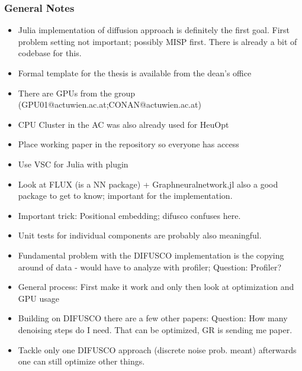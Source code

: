 \subsubsection{General Notes}
\begin{itemize}
    \item Julia implementation of diffusion approach is definitely the first goal. First problem setting not important; possibly MISP first. There is already a bit of codebase for this.
    \item Formal template for the thesis is available from the dean's office
    \item There are GPUs from the group (GPU01@actuwien.ac.at;CONAN@actuwien.ac.at)
    \item CPU Cluster in the AC was also already used for HeuOpt
    \item Place working paper in the repository so everyone has access
    \item Use VSC for Julia with plugin
    \item Look at FLUX (is a NN package) + Graphneuralnetwork.jl also a good package to get to know; important for the implementation.
    \item Important trick: Positional embedding; difusco confuses here.
    \item Unit tests for individual components are probably also meaningful.
    \item Fundamental problem with the DIFUSCO implementation is the copying around of data - would have to analyze with profiler; Question: Profiler?
    \item General process: First make it work and only then look at optimization and GPU usage
    \item Building on DIFUSCO there are a few other papers: Question: How many denoising steps do I need. That can be optimized, GR is sending me paper.
    \item Tackle only one DIFUSCO approach (discrete noise prob. meant) afterwards one can still optimize other things.
\end{itemize}